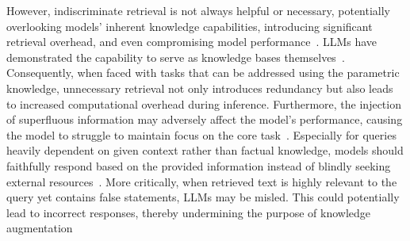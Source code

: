However, indiscriminate retrieval is not always helpful or necessary, potentially overlooking models' inherent knowledge capabilities, introducing significant retrieval overhead, and even compromising model performance~\cite{chen2023understanding,tan2024blinded}.
% 
LLMs have demonstrated the capability to serve as knowledge bases themselves~\cite{petroni-etal-2019-language}. 
Consequently, when faced with tasks that can be addressed using the parametric knowledge, unnecessary retrieval not only introduces redundancy but also leads to increased computational overhead during inference.
% 
Furthermore, the injection of superfluous information may adversely affect the model's performance, causing the model to struggle to maintain focus on the core task~\cite{liu-etal-2024-lost}. 
% 
Especially for queries heavily dependent on given context rather than factual knowledge, models should faithfully respond based on the provided information instead of blindly seeking external resources~\cite{huang2023survey}.
% 
More critically, when retrieved text is highly relevant to the query yet contains false statements,
LLMs may be misled. This could potentially lead to incorrect responses, thereby undermining the purpose of knowledge augmentation~\cite{bian2024influence,chen2024benchmarking}









